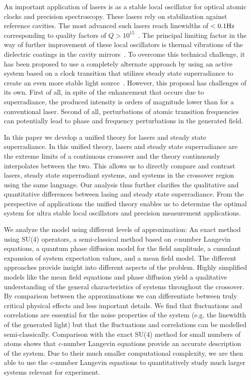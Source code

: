\documentclass[aps,
twocolumn,
superscriptaddress,groupedaddress]{revtex4}
\begin{document}
An important application of lasers is as a stable local oscillator for
optical atomic clocks and precision spectroscopy.  These lasers rely on
stabilization against reference cavities.  The most advanced such lasers
reach linewidths of $< 0.1 {\rm Hz}$ corresponding to quality factors of
$Q>10^{15}$~\cite{Cole:TenfoldReductionBrownianNoise}. The principal
limiting factor in the way of further improvement of these local
oscillators is thermal vibrations of the dielectric coatings in the
cavity mirrors~\cite{PhysRevLett.101.260602}.  To overcome this
technical challenge, it has been proposed to use a completely alternate
approach by using an active system based on a clock transition that
utilizes steady state superradiance to create an even more stable light
source~\cite{PhysRevLett.102.163601, ChenDeliciousLaser}.  However, this
proposal has challenges of its own.  First of all, in spite of the
enhancement that occurs due to superradiance, the produced intensity is
orders of magnitude lower than for a conventional laser.  Second of all,
perturbations of atomic transition frequencies can potentially lead to
phase and frequency perturbations in the generated field.

In this paper we develop a unified theory for lasers and steady state
superradiance.  In this unified theory, lasers and steady state
superradiance are the extreme limits of a continuous crossover and the
theory continuously interpolates between the two.  This allows us to
directly compare and contrast lasers, steady state superradiant systems,
and systems in the crossover region using the same language.  Our
analysis thus further clarifies the qualitative and quantitative
differences between lasing and steady state superradiance.  From the
perspective of applications the unified theory enables us to determine
the optimal system for ultra stable local oscillators and precision
measurement applications.

We analyze the model using different levels of approximation: An exact
method using SU(4) operators, a semi-classical method based on {\it
c}-number Langevin equations, a quantum phase diffusion model for the
field amplitude, a cumulant expansion of system expectation values, and
a mean field model.  The different approaches provide insight into
different aspects of the problem.  Highly simplified models like the
mean field equations and phase diffusion yield a qualitative
understanding of the general characteristics of systems throughout the
crossover.  By comparison between the approximations we can
differentiate between truly critical physical effects and less important
details.  We find that fluctuations and correlations are essential for
the noise properties of the system (e.g. the linewidth of the generated
light) but that the fluctuations and correlations can be modelled
semi-classically.  Comparison with the exact SU(4) method for small
numbers of atoms shows that {\it c}-number Langevin equations provide an
accurate description of the system.  Due to their much smaller
computational complexity, we are then able to use the {\it c}-number
Langevin equations to quantitatively study much larger systems relevant
for experiment.
\end{document}

